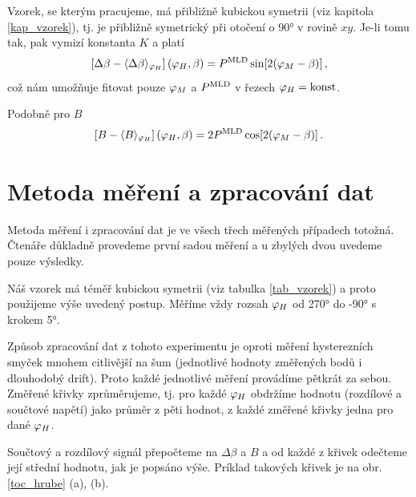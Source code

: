 Vzorek, se kterým pracujeme, má přibližně kubickou symetrii (viz kapitola \ref{kap_vzorek}), tj. je přibližně symetrický při otočení o \ang{90} v rovině $xy$. Je-li tomu tak, pak vymizí konstanta $K$ a platí
\begin{equation} \label{e:asass}
\left[ \Delta \beta - \langle \Delta\beta \rangle_{\varphi_H}  \right](\varphi_H, \beta)=P^{\text{MLD}} \sin[2(\varphi_M-\beta)] \,,
\end{equation}
což nám umožňuje fitovat pouze $\varphi_M$ a $P^{\text{MLD}}$ v řezech $\varphi_H=\text{konst}$.

Podobně pro $B$
\begin{equation} \label{e:sss}
\left[ B - \langle B \rangle_{\varphi_H}  \right](\varphi_H, \beta)=2P^{\text{MLD}} \cos[2(\varphi_M-\beta)] \,.
\end{equation}


\section{Metoda měření a zpracování dat}

Metoda měření i zpracování dat je ve všech třech měřených případech totožná. Čtenáře důkladně provedeme první sadou měření a u zbylých dvou uvedeme pouze výsledky.

Náš vzorek má téměř kubickou symetrii (viz tabulka \ref{tab_vzorek}) a proto použijeme výše uvedený postup.
Měříme vždy rozsah $\varphi_H$ od \ang{270} do \ang{-90} s krokem \ang{5}.

Způsob zpracování dat z tohoto experimentu je oproti měření hysterezních smyček mnohem citlivější na šum (jednotlivé hodnoty změřených bodů i dlouhodobý drift). Proto každé jednotlivé měření provádíme pětkrát za sebou. Změřené křivky zprůměrujeme, tj. pro každé $\varphi_H$ obdržíme hodnotu (rozdílové a součtové napětí) jako průměr z pěti hodnot, z každé změřené křivky jedna pro dané $\varphi_H$.


Součtový a rozdílový signál přepočteme na $\Delta\beta$ a $B$ a od každé z křivek odečteme její střední hodnotu, jak je popsáno výše.
Príklad takových křivek je na obr. \ref{toc_hrube} (a), (b). 


